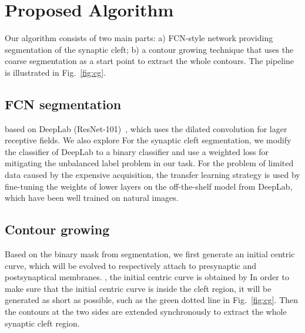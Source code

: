 \section{Proposed Algorithm}
\label{sec:algorithm}


Our algorithm consists of two main parts:
a)  FCN-style network providing  segmentation of the synaptic cleft;
b) a contour growing technique that uses the coarse segmentation as a start point to extract the whole contours.
The pipeline is illustrated in Fig.~\ref{fig:cg}.

\subsection{FCN segmentation}
 based on DeepLab (ResNet-101)~\cite{Chen2016a}, which uses the dilated convolution for lager receptive fields.
%
We also explore 
%
For the synaptic cleft segmentation, we modify the classifier of DeepLab to a binary classifier and use a weighted loss for mitigating the unbalanced label problem in our task.
For the problem of limited data caused by the expensive acquisition, the transfer learning strategy is used by fine-tuning the weights of lower layers on the off-the-shelf model from DeepLab, which have been well trained on natural images.


\subsection{Contour growing}

Based on the binary mask from  segmentation, we first generate an initial centric curve, which will be evolved to respectively attach to presynaptic and postsynaptical membranes.
%
, the initial centric curve is obtained by 
%
In order to make sure that the initial centric curve is inside the cleft region, it will be generated as short as possible, such as the green dotted line in Fig.~\ref{fig:cg}.
%
Then the contours at the two sides are extended synchronously to extract the whole synaptic cleft region.




